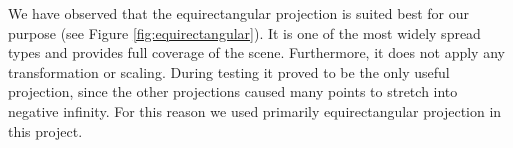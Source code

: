 We have observed that the equirectangular projection is suited best for our purpose (see Figure \ref{fig:equirectangular}). It is one of the most widely spread types and provides full coverage of the scene. Furthermore, it does not apply any transformation or scaling. During testing it proved to be the only useful projection, since the other projections caused many points to stretch into negative infinity. For this reason we used primarily equirectangular projection in this project.
